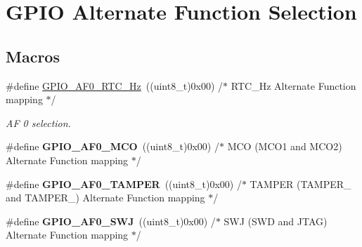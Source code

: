 \hypertarget{group___g_p_i_o___alternate__function__selection}{}\section{G\+P\+IO Alternate Function Selection}
\label{group___g_p_i_o___alternate__function__selection}
\subsection*{Macros}
\begin{DoxyCompactItemize}
\item 
\#define \hyperlink{group___g_p_i_o___alternate__function__selection_ga93a65e75bfe22810f2e8f8eff9b3618b}{G\+P\+I\+O\+\_\+\+A\+F0\+\_\+\+R\+T\+C\+\_\+Hz}~((uint8\+\_\+t)0x00)  /$\ast$ R\+T\+C\+\_\+Hz Alternate Function mapping                       $\ast$/\hypertarget{group___g_p_i_o___alternate__function__selection_ga93a65e75bfe22810f2e8f8eff9b3618b}{}\label{group___g_p_i_o___alternate__function__selection_ga93a65e75bfe22810f2e8f8eff9b3618b}

\begin{DoxyCompactList}\small\item\em AF 0 selection. \end{DoxyCompactList}\item 
\#define {\bfseries G\+P\+I\+O\+\_\+\+A\+F0\+\_\+\+M\+CO}~((uint8\+\_\+t)0x00)  /$\ast$ M\+C\+O (\+M\+C\+O1 and M\+C\+O2) Alternate Function mapping            $\ast$/\hypertarget{group___g_p_i_o___alternate__function__selection_ga2c2c2ebb2b09db35be06740566eeda5d}{}\label{group___g_p_i_o___alternate__function__selection_ga2c2c2ebb2b09db35be06740566eeda5d}

\item 
\#define {\bfseries G\+P\+I\+O\+\_\+\+A\+F0\+\_\+\+T\+A\+M\+P\+ER}~((uint8\+\_\+t)0x00)  /$\ast$ T\+A\+M\+P\+E\+R (\+T\+A\+M\+P\+E\+R\+\_ and T\+A\+M\+P\+E\+R\+\_) Alternate Function mapping $\ast$/\hypertarget{group___g_p_i_o___alternate__function__selection_ga182a9c4d59db0aa5ab63a1b133ebe495}{}\label{group___g_p_i_o___alternate__function__selection_ga182a9c4d59db0aa5ab63a1b133ebe495}

\item 
\#define {\bfseries G\+P\+I\+O\+\_\+\+A\+F0\+\_\+\+S\+WJ}~((uint8\+\_\+t)0x00)  /$\ast$ S\+W\+J (\+S\+W\+D and J\+T\+A\+G) Alternate Function mapping             $\ast$/\hypertarget{group___g_p_i_o___alternate__function__selection_gaa2f012907797b7a0d3ef1831cb8f013f}{}\label{group___g_p_i_o___alternate__function__selection_gaa2f012907797b7a0d3ef1831cb8f013f}


\end{DoxyCompactItemize}
